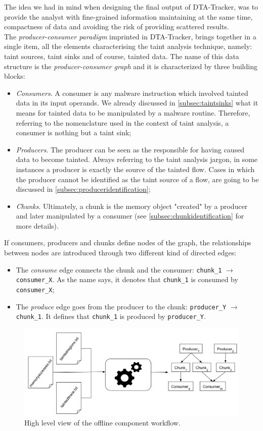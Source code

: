 \documentclass[LaM,binding=0.6cm]{sapthesis}
\begin{document}
The idea we had in mind when designing the final output of DTA-Tracker, was to provide the analyst with fine-grained information maintaining at the same time, compactness of data and avoiding the risk of providing scattered results.\\
The \textit{producer-consumer paradigm} imprinted in DTA-Tracker, brings together in a single item, all the elements characterising the taint analysis technique, namely: taint sources, taint sinks and of course, tainted data. The name of this data structure is the \textit{producer-consumer graph} and it is characterized by three building blocks:
\begin{itemize}
\item \textit{Consumers}. A consumer is any malware instruction which involved tainted data in its input operands. We already discussed in \autoref{subsec:taintsinks} what it means for tainted data to be manipulated by a malware routine. Therefore, referring to the nomenclature used in the context of taint analysis, a consumer is nothing but a taint sink;
\item \textit{Producers}. The producer can be seen as the responsible for having caused data to become tainted. Always referring to the taint analysis jargon, in some instances a producer is exactly the source of the tainted flow. Cases in which the producer cannot be identified as the taint source of a flow, are going to be discussed in \autoref{subsec:produceridentification};
\item \textit{Chunks}. Ultimately, a chunk is the memory object "created" by a producer and later manipulated by a consumer (see \autoref{subsec:chunkidentification} for more details). 
\end{itemize}
If consumers, producers and chunks define nodes of the graph, the relationships between nodes are introduced through two different kind of directed edges:
\begin{itemize}
\item The \textit{consume} edge connects the chunk and the consumer: \texttt{chunk\_1} $\rightarrow$ \texttt{consumer\_X}. As the name says, it denotes that \texttt{chunk\_1}  is consumed by \texttt{consumer\_X};
\item The \textit{produce} edge goes from the producer to the chunk: \texttt{producer\_Y} $\rightarrow$ \texttt{chunk\_1}. It defines that \texttt{chunk\_1} is produced by \texttt{producer\_Y}.
\end{itemize}

\begin{figure}[h!]
\centering
\includegraphics[scale=.45]{images/dtatracker3}
\caption{High level view of the offline component workflow.}
\end{figure}
\end{document}

